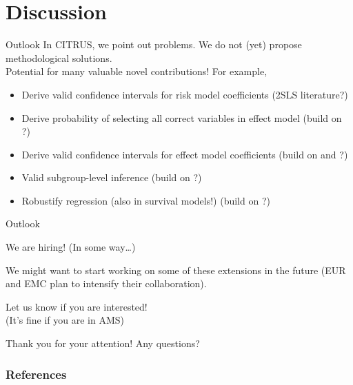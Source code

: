 \documentclass[11pt]{beamer}
\begin{document}
\section{Discussion}

\begin{frame}{Outlook}
In CITRUS, we point out problems. We do not (yet) propose methodological solutions.\\ 
\textcolor{emc-darkblue}{} \alert{Potential for many valuable novel contributions!} For example,

\begin{itemize}\setlength\itemsep{1em}
	\item Derive valid confidence intervals for risk model coefficients (2SLS literature?)
	\item Derive probability of selecting all correct variables in effect model (build on \cite{bien2013}?)
	\item Derive valid confidence intervals for effect model coefficients (build on \cite{dezeure2015} and \cite{vandegeer2016estimation}?)
	\item Valid subgroup-level inference (build on \cite{guo2021}?)
	\item Robustify regression (also in survival models!) (build on \cite{lecue2020}?)
\end{itemize}
\end{frame}

\begin{frame}{Outlook}
\begin{center}
\Huge{We are hiring! (In some way\dots)}
\end{center}

\begin{center}
We might want to start working on some of these extensions in the future (EUR and EMC plan to intensify their collaboration). \bigskip
\end{center}

\begin{center}
\LARGE{\alert{Let us know if you are interested!} \\(It's fine if you are in AMS)}
\end{center}
\end{frame}

\begin{frame}
\centering \Huge{Thank you for your attention! Any questions?}
\end{frame}



\begin{frame}[t,allowframebreaks]
\frametitle{References}

\end{frame}
\end{document}
